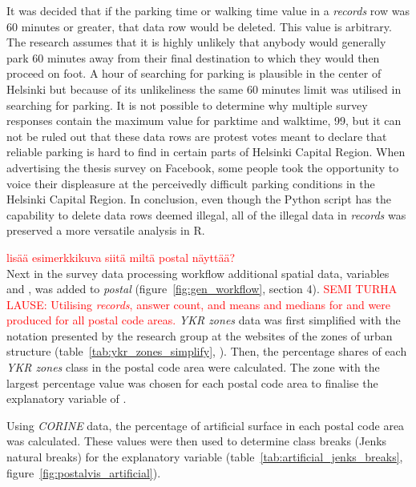 It was decided that if the parking time or walking time value in a \textit{records} row was 60 minutes or greater, that data row would be deleted. This value is arbitrary. The research assumes that it is highly unlikely that anybody would generally park 60 minutes away from their final destination to which they would then proceed on foot. A hour of searching for parking is plausible in the center of Helsinki but because of its unlikeliness the same 60 minutes limit was utilised in searching for parking. It is not possible to determine why multiple survey responses contain the maximum value for parktime and walktime, 99, but it can not be ruled out that these data rows are protest votes meant to declare that reliable parking is hard to find in certain parts of Helsinki Capital Region. When advertising the thesis survey on Facebook, some people took the opportunity to voice their displeasure at the perceivedly difficult parking conditions in the Helsinki Capital Region. In conclusion, even though the Python script has the capability to delete data rows deemed illegal, all of the illegal data in \textit{records} was preserved a more versatile analysis in R.

\textcolor{red}{lisää esimerkkikuva siitä miltä postal näyttää?}\\
Next in the survey data processing workflow additional spatial data, variables  and , was added to \textit{postal} (figure~\ref{fig:gen_workflow}, section 4). \textcolor{red}{SEMI TURHA LAUSE: Utilising \textit{records}, answer count, and means and medians for  and  were produced for all postal code areas.} \textit{YKR zones} data was first simplified with the notation presented by the research group at the websites of the zones of urban structure (table~\ref{tab:ykr_zones_simplify}, \cite{FinnishEnvironmentInstitute2013}). Then, the percentage shares of each \textit{YKR zones} class in the postal code area were calculated. The zone with the largest percentage value was chosen for each postal code area to finalise the explanatory variable of .

Using \textit{CORINE} data, the percentage of artificial surface in each postal code area was calculated. These values were then used to determine class breaks (Jenks natural breaks) for the explanatory variable  (table~\ref{tab:artificial_jenks_breaks}, figure~\ref{fig:postalvis_artificial}).

